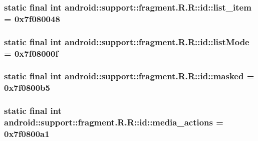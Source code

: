 \hypertarget{classandroid_1_1support_1_1fragment_1_1_r_1_1id_5f92fb677cc11fdc16f4ac858b32f021}{
\subsubsection[{list\_\-item}]{\setlength{\rightskip}{0pt plus 5cm}static final int android::support::fragment.R.R::id::list\_\-item = 0x7f080048}}
\label{classandroid_1_1support_1_1fragment_1_1_r_1_1id_5f92fb677cc11fdc16f4ac858b32f021}


\hypertarget{classandroid_1_1support_1_1fragment_1_1_r_1_1id_affc8a24fb1146feaad8d6b9f5ea8c27}{
\subsubsection[{listMode}]{\setlength{\rightskip}{0pt plus 5cm}static final int android::support::fragment.R.R::id::listMode = 0x7f08000f}}
\label{classandroid_1_1support_1_1fragment_1_1_r_1_1id_affc8a24fb1146feaad8d6b9f5ea8c27}


\hypertarget{classandroid_1_1support_1_1fragment_1_1_r_1_1id_236ad66f7df9ff2041cfca769fc2d6fb}{
\subsubsection[{masked}]{\setlength{\rightskip}{0pt plus 5cm}static final int android::support::fragment.R.R::id::masked = 0x7f0800b5}}
\label{classandroid_1_1support_1_1fragment_1_1_r_1_1id_236ad66f7df9ff2041cfca769fc2d6fb}


\hypertarget{classandroid_1_1support_1_1fragment_1_1_r_1_1id_6508658a3126426119a12505e5174829}{
\subsubsection[{media\_\-actions}]{\setlength{\rightskip}{0pt plus 5cm}static final int android::support::fragment.R.R::id::media\_\-actions = 0x7f0800a1}}
\label{classandroid_1_1support_1_1fragment_1_1_r_1_1id_6508658a3126426119a12505e5174829}


